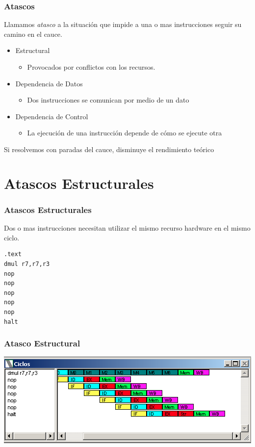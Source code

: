 \documentclass{beamer}
\begin{document}
\begin{frame}
\frametitle{Atascos}
Llamamos \emph{atasco} a la situación que impide a una o mas instrucciones seguir su camino en el cauce.

\begin{itemize}
\item Estructural
\begin{itemize}
\item Provocados por conflictos con los recursos.
\end{itemize}


\item Dependencia de Datos
\begin{itemize}
\item Dos instrucciones se comunican por medio de un dato
\end{itemize}

\item Dependencia de Control
\begin{itemize}
\item La ejecución de una instrucción depende de cómo se ejecute otra
\end{itemize}

\end{itemize}
Si resolvemos con paradas del cauce, disminuye el rendimiento teórico
\end{frame}


\section{Atascos Estructurales}

\begin{frame}[fragile]
\frametitle{Atascos Estructurales}
Dos o mas instrucciones necesitan utilizar el mismo recurso hardware en el mismo ciclo.

\begin{block}{}
\begin{lstlisting}[language=WinMIPS64,basicstyle=\ttfamily,keywordstyle=\color{blue}]
.text
dmul r7,r7,r3
nop 
nop 
nop 
nop 
nop 
halt
\end{lstlisting}
\end{block}
\end{frame}

\begin{frame}[fragile]
\frametitle{Atasco Estructural}
\includegraphics[scale=0.45]{atasco-estructural.png}
\end{frame}
\end{document}
